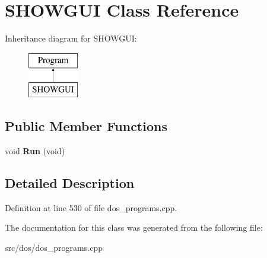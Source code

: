 \hypertarget{classSHOWGUI}{\section{S\-H\-O\-W\-G\-U\-I Class Reference}
\label{classSHOWGUI}
}
Inheritance diagram for S\-H\-O\-W\-G\-U\-I\-:\begin{figure}[H]
\begin{center}
\leavevmode
\includegraphics[height=2.000000cm]{classSHOWGUI}
\end{center}
\end{figure}
\subsection*{Public Member Functions}
\begin{DoxyCompactItemize}
\item 
\hypertarget{classSHOWGUI_a6aa41914fca5264f9c63856c9578dd29}{void {\bfseries Run} (void)}\label{classSHOWGUI_a6aa41914fca5264f9c63856c9578dd29}

\end{DoxyCompactItemize}


\subsection{Detailed Description}


Definition at line 530 of file dos\-\_\-programs.\-cpp.



The documentation for this class was generated from the following file\-:\begin{DoxyCompactItemize}
\item 
src/dos/dos\-\_\-programs.\-cpp\end{DoxyCompactItemize}
